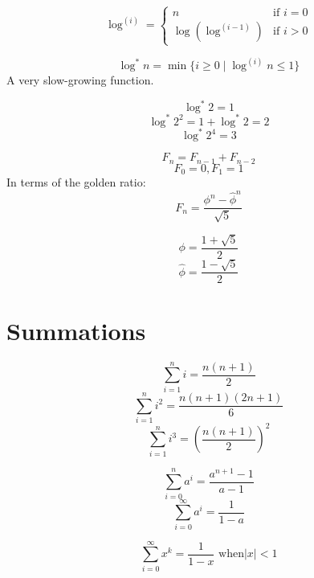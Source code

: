 \begin{definition}
    \[
        \log^(i) = \begin{cases}
            n                  & \text{if } i = 0 \\
            \log(\log^{(i-1)}) & \text{if } i > 0
        \end{cases}
    \]

\end{definition}

\begin{definition}
    \[\log^{*} n = \min \{ i \geq 0 \mid \log^{(i)} n \leq 1 \}\]
    A very slow-growing function.
\end{definition}

\begin{example}
    \[
        \log^{*} 2 = 1
    \]
    \[
        \log^{*} 2^2 = 1 + \log^{*} 2 = 2
    \]
    \[
        \log^{*} 2^4 = 3
    \]
\end{example}

\begin{definition}
    \[
        F_n = F_{n-1} + F_{n-2}
    \]
    \[
        F_0 = 0, F_1 = 1
    \]
    In terms of the golden ratio:
    \[
        F_n = \frac{\phi^n - \hat{\phi}^n}{\sqrt{5}}
    \]
\end{definition}

\begin{definition}
    \[
        \phi = \frac{1 + \sqrt{5}}{2}
    \]
    \[
        \hat{\phi} = \frac{1 - \sqrt{5}}{2}
    \]
\end{definition}

\section{Summations}
\begin{definition}
    \[
        \sum_{i=1}^{n} i = \frac{n(n+1)}{2}
    \]
    \[
        \sum_{i=1}^{n} i^2 = \frac{n(n+1)(2n+1)}{6}
    \]
    \[
        \sum_{i=1}^{n} i^3 = \left( \frac{n(n+1)}{2} \right)^2
    \]
\end{definition}

\begin{definition}
    \[
        \sum_{i=0}^{n} a^i = \frac{a^{n+1} - 1}{a - 1}
    \]
    \[
        \sum_{i=0}^{\infty} a^i = \frac{1}{1 - a}
    \]
\end{definition}

\begin{definition}
    \[
        \sum_{i=0}^{\infty} x^k = \frac{1}{1 - x} \text{ when} |x| < 1
    \]
\end{definition}

